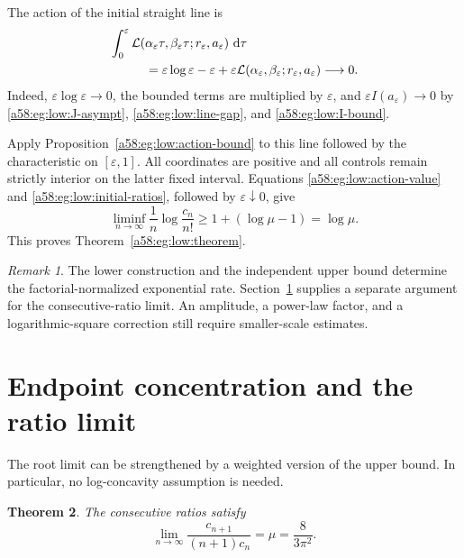 \documentclass[11pt,letterpaper]{article}
\newtheorem{theorem}{Theorem}[section]
\theoremstyle{remark}
\newtheorem{remark}[theorem]{Remark}
\newcommand{\egdd}{\,\mathrm d}
\newcommand{\muval}{\mu}
\begin{document}
The action of the initial straight line is
\begin{align*}
 &\int_0^\varepsilon
 {\cal L}(\alpha_\varepsilon\tau,\beta_\varepsilon\tau;
                    r_\varepsilon,a_\varepsilon)\,\egdd\tau\\
 &\hspace{1cm}=
 \varepsilon\log\varepsilon-\varepsilon+
 \varepsilon{\cal L}(\alpha_\varepsilon,\beta_\varepsilon;
                    r_\varepsilon,a_\varepsilon)
 \longrightarrow0.
\end{align*}
Indeed, \(\varepsilon\log\varepsilon\to0\), the bounded terms are
multiplied by \(\varepsilon\), and
\(\varepsilon I(a_\varepsilon)\to0\) by
\eqref{a58:eg:low:J-asympt}, \eqref{a58:eg:low:line-gap}, and \eqref{a58:eg:low:I-bound}.

Apply Proposition~\ref{a58:eg:low:action-bound} to this line followed by the
characteristic on \([\varepsilon,1]\).
All coordinates are positive and all controls remain strictly interior
on the latter fixed interval. Equations
\eqref{a58:eg:low:action-value} and \eqref{a58:eg:low:initial-ratios}, followed by
\(\varepsilon\downarrow0\), give
\[
 \liminf_{n\to\infty}\frac1n\log\frac{c_n}{n!}
 \ge 1+(\log\muval-1)=\log\muval.
\]
This proves Theorem~\ref{a58:eg:low:theorem}.

\begin{remark}\label{a58:eg:low:scope}
The lower construction and the independent upper bound determine the
factorial-normalized exponential rate. Section~\ref{a58:eg:sec:ratio} supplies a separate argument for the consecutive-ratio limit. An amplitude, a power-law factor, and a logarithmic-square correction still require smaller-scale estimates.
\end{remark}

\section{Endpoint concentration and the ratio limit}\label{a58:eg:sec:ratio}
The root limit can be strengthened by a weighted version of the upper bound. In particular, no log-concavity assumption is needed.
\begin{theorem}\label{a58:eg:rat:ratio}
The consecutive ratios satisfy
\[
 \lim_{n\to\infty}\frac{c_{n+1}}{(n+1)c_n}
 =\muval=\frac{8}{3\pi^2}.
\]
\end{theorem}
\end{document}
